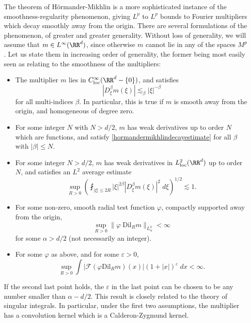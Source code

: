 The theorem of H\"{o}rmander-Mikhlin is a more sophisticated instance of the smoothness-regularity phenomenon, giving $L^p$ to $L^p$ bounds to Fourier multipliers which decay smoothly away from the origin. There are several formulations of the phenomenon, of greater and greater generality. Without loss of generality, we will assume that $m \in L^\infty(\RR^d)$, since otherwise $m$ cannot lie in any of the spaces $M^p$. Let us state them in increasing order of generality, the former being most easily seen as relating to the smoothness of the multipliers:
%
\begin{itemize}
    \item The multiplier $m$ lies in $C^\infty_{\text{loc}}(\RR^d - \{ 0 \})$, and satisfies
    \begin{equation} \label{hormandermikhlindecayestimate}
        |D^\beta_\xi m(\xi)| \lesssim_\beta |\xi|^{-\beta}
    \end{equation}
    for all multi-indices $\beta$. In particular, this is true if $m$ is smooth away from the origin, and homogeneous of degree zero.

    \item For some integer $N$ with $N > d/2$, $m$ has weak derivatives up to order $N$ which are functions, and satisfy \eqref{hormandermikhlindecayestimate} for all $\beta$ with $|\beta| \leq N$.

    \item For some integer $N > d/2$, $m$ has weak derivatives in $L^2_{\text{loc}}(\RR^d)$ up to order $N$, and satisfies an $L^2$ average estimate
    \[ \sup_{R > 0} \left( \fint_{|\xi| \leq 2R} |\xi|^{2\beta} |D^\beta_\xi m(\xi)|^2\; d\xi \right)^{1/2} \lesssim 1. \]

    \item For some non-zero, smooth radial test function $\varphi$, compactly supported away from the origin,
    \begin{equation}
        \sup_{R > 0} \| \varphi\; \text{Dil}_R m \|_{L^2_\alpha} < \infty
    \end{equation}
    for some $\alpha > d/2$ (not necessarily an integer).

    \item For some $\varphi$ as above, and for some $\varepsilon > 0$,
    \[ \sup_{R > 0} \int |\mathcal{F}( \varphi \text{Dil}_R m)(x)| (1 + |x|)^{\varepsilon}\; dx < \infty.  \]
\end{itemize}
%
If the second last point holds, the $\varepsilon$ in the last point can be chosen to be any number smaller than $\alpha - d/2$. This result is closely related to the theory of singular integrals. In particular, under the first two assumptions, the multiplier has a convolution kernel which is a Calderon-Zygmund kernel.

